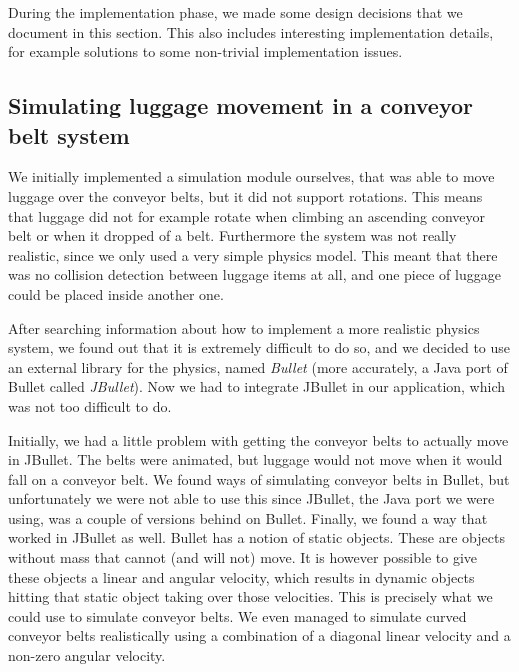 During the implementation phase, we made some design decisions that we document in this section. This also includes interesting implementation details, for example solutions to some non-trivial implementation issues.

\subsection{Simulating luggage movement in a conveyor belt system}
We initially implemented a simulation module ourselves, that was able to move luggage over the conveyor belts, but it did not support rotations. This means that luggage did not for example rotate when climbing an ascending conveyor belt or when it dropped of a belt. Furthermore the system was not really realistic, since we only used a very simple physics model. This meant that there was no collision detection between luggage items at all, and one piece of luggage could be placed inside another one.

After searching information about how to implement a more realistic physics system, we found out that it is extremely difficult to do so, and we decided to use an external library for the physics, named \emph{Bullet} (more accurately, a Java port of Bullet called \emph{JBullet}). Now we had to integrate JBullet in our application, which was not too difficult to do.

Initially, we had a little problem with getting the conveyor belts to actually move in JBullet. The belts were animated, but luggage would not move when it would fall on a conveyor belt. We found ways of simulating conveyor belts in Bullet, but unfortunately we were not able to use this since JBullet, the Java port we were using, was a couple of versions behind on Bullet. Finally, we found a way that worked in JBullet as well. Bullet has a notion of static objects. These are objects without mass that cannot (and will not) move. It is however possible to give these objects a linear and angular velocity, which results in dynamic objects hitting that static object taking over those velocities. This is precisely what we could use to simulate conveyor belts. We even managed to simulate curved conveyor belts realistically using a combination of a diagonal linear velocity and a non-zero angular velocity.